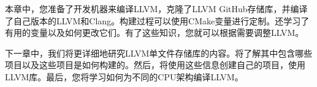 本章中，您准备了开发机器来编译LLVM，克隆了LLVM GitHub存储库，并编译了自己版本的LLVM和Clang。构建过程可以使用CMake变量进行定制。还学习了有用的变量以及如何更改它们。有了这些知识，您就可以根据需要调整LLVM。\par

下一章中，我们将更详细地研究LLVM单文件存储库的内容。将了解其中包含哪些项目以及这些项目是如何构建的。然后，将使用这些信息创建自己的项目，使用LLVM库。最后，您将学习如何为不同的CPU架构编译LLVM。\par

\newpage